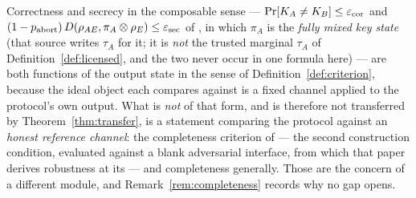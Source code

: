 
\begin{remark}\label{rem:criteria}
Correctness and secrecy in the composable sense ---
$\Pr[K_A\neq K_B]\le\varepsilon_{\rm cor}$ and
$(1-p_{\mathrm{abort}})\,D(\rho_{AE},\pi_A\otimes\rho_E)\le
\varepsilon_{\rm sec}$ of \cite[Eqs.~(13)--(14)]{portmann2022security}, in
which $\pi_A$ is the \emph{fully mixed key state} (that source writes $\tau_A$
for it; it is \emph{not} the trusted marginal $\tau_A$ of
Definition~\ref{def:licensed}, and the two never occur in one formula here)
--- are both functions of the output state in the sense of
Definition~\ref{def:criterion}, because the ideal object each compares
against is a fixed channel applied to the protocol's own output. What is
\emph{not} of that form, and is therefore not transferred by
Theorem~\ref{thm:transfer}, is a statement comparing the protocol against an
\emph{honest reference channel}: the completeness criterion of
\cite[Eq.~(9)]{portmann2022security} --- the second construction condition,
evaluated against a blank adversarial interface, from which that paper derives
robustness at its \cite[Eq.~(15)]{portmann2022security} --- and completeness
generally. Those are the concern of a different module, and
Remark~\ref{rem:completeness} records why no gap opens.
\end{remark}
